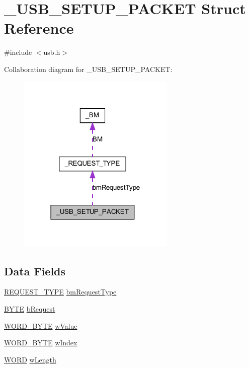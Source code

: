 \hypertarget{struct___u_s_b___s_e_t_u_p___p_a_c_k_e_t}{
\section{\_\-USB\_\-SETUP\_\-PACKET Struct Reference}
\label{struct___u_s_b___s_e_t_u_p___p_a_c_k_e_t}
}


{\ttfamily \#include $<$usb.h$>$}



Collaboration diagram for \_\-USB\_\-SETUP\_\-PACKET:
\nopagebreak
\begin{figure}[H]
\begin{center}
\leavevmode
\includegraphics[width=213pt]{struct___u_s_b___s_e_t_u_p___p_a_c_k_e_t__coll__graph}
\end{center}
\end{figure}
\subsection*{Data Fields}
\begin{DoxyCompactItemize}
\item 
\hyperlink{usb_8h_a1cf9602c496d0762c0e710c7a1268a69}{REQUEST\_\-TYPE} \hyperlink{struct___u_s_b___s_e_t_u_p___p_a_c_k_e_t_a8be0eb8a27686ac4f4831003b5c6f792}{bmRequestType}
\item 
\hyperlink{type_8h_a4ae1dab0fb4b072a66584546209e7d58}{BYTE} \hyperlink{struct___u_s_b___s_e_t_u_p___p_a_c_k_e_t_a7bab96f30abf205e60392ab8e8339be7}{bRequest}
\item 
\hyperlink{usb_8h_a77276c9590f0da754a35b4cbf309c2c7}{WORD\_\-BYTE} \hyperlink{struct___u_s_b___s_e_t_u_p___p_a_c_k_e_t_a59d9039047a52815cb1981f19634d40d}{wValue}
\item 
\hyperlink{usb_8h_a77276c9590f0da754a35b4cbf309c2c7}{WORD\_\-BYTE} \hyperlink{struct___u_s_b___s_e_t_u_p___p_a_c_k_e_t_aeca4b5d6b50d0b1b2db278cb4efc0436}{wIndex}
\item 
\hyperlink{type_8h_a197942eefa7db30960ae396d68339b97}{WORD} \hyperlink{struct___u_s_b___s_e_t_u_p___p_a_c_k_e_t_ab26bdd09e9c7779cfbd95b4e90b3f178}{wLength}
\end{DoxyCompactItemize}


